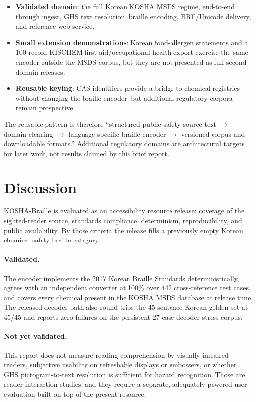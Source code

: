 \documentclass[smallextended]{svjour3}
\begin{document}
\begin{itemize}
\item \textbf{Validated domain}: the full Korean KOSHA MSDS regime, end-to-end through ingest, GHS text resolution, braille encoding, BRF/Unicode delivery, and reference web service.
\item \textbf{Small extension demonstrations}: Korean food-allergen statements and a 100-record KISCHEM first-aid/occupational-health export exercise the same encoder outside the MSDS corpus, but they are not presented as full second-domain releases.
\item \textbf{Reusable keying}: CAS identifiers provide a bridge to chemical registries without changing the braille encoder, but additional regulatory corpora remain prospective.
\end{itemize}

The reusable pattern is therefore ``structured public-safety source text $\rightarrow$ domain cleaning $\rightarrow$ language-specific braille encoder $\rightarrow$ versioned corpus and downloadable formats.'' Additional regulatory domains are architectural targets for later work, not results claimed by this brief report.

\section{Discussion}
\label{sec:discussion}

KOSHA-Braille is evaluated as an accessibility resource release: coverage of the sighted-reader source, standards compliance, determinism, reproducibility, and public availability. By those criteria the release fills a previously empty Korean chemical-safety braille category.

\paragraph{Validated.}
The encoder implements the 2017 Korean Braille Standards deterministically, agrees with an independent converter at 100\% over 442 cross-reference test cases, and covers every chemical present in the KOSHA MSDS database at release time. The released decoder path also round-trips the 45-sentence Korean golden set at 45/45 and reports zero failures on the persistent 27-case decoder stress corpus.

\paragraph{Not yet validated.}
This report does not measure reading comprehension by visually impaired readers, subjective usability on refreshable displays or embossers, or whether GHS pictogram-to-text resolution is sufficient for hazard recognition. Those are reader-interaction studies, and they require a separate, adequately powered user evaluation built on top of the present resource.
\end{document}

